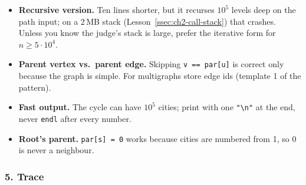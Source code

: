 \begin{tricksbox}
\begin{itemize}[leftmargin=*]
    \item \textbf{Recursive version.} Ten lines shorter, but it recurses $10^5$ levels deep on the path input; on a 2\,MB stack (Lesson~\ref{ssec:ch2-call-stack}) that crashes. Unless you know the judge's stack is large, prefer the iterative form for $n \ge 5\cdot10^4$.
    \item \textbf{Parent vertex vs.\ parent edge.} Skipping \texttt{v == par[u]} is correct only because the graph is simple. For multigraphs store edge ids (template 1 of the pattern).
    \item \textbf{Fast output.} The cycle can have $10^5$ cities; print with one \texttt{"\textbackslash n"} at the end, never \texttt{endl} after every number.
    \item \textbf{Root's parent.} \texttt{par[s] = 0} works because cities are numbered from 1, so 0 is never a neighbour.
\end{itemize}
\end{tricksbox}

\subsubsection*{5. Trace}

